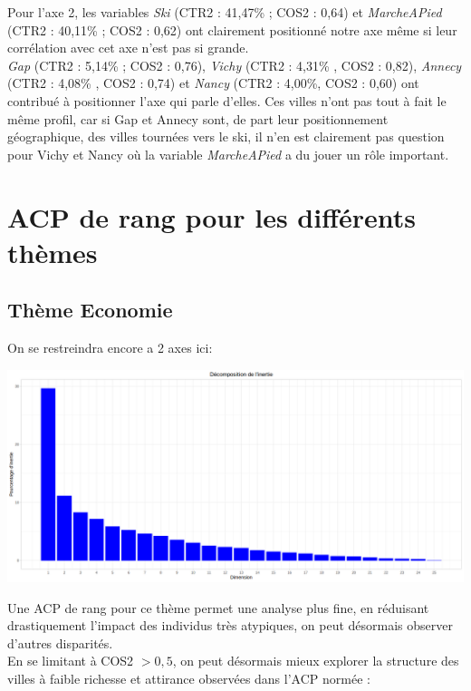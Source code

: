 \documentclass{article}
\begin{document}
Pour l'axe 2, les variables \emph{Ski} (CTR2 : 41,47\% ; COS2 : 0,64) et \emph{MarcheAPied} (CTR2 : 40,11\% ; COS2 : 0,62) ont clairement positionné notre axe même si leur corrélation avec cet axe n'est pas si grande. \\

\emph{Gap} (CTR2 : 5,14\% ; COS2 : 0,76), \emph{Vichy} (CTR2 : 4,31\% , COS2 : 0,82), \emph{Annecy} (CTR2 : 4,08\% , COS2 : 0,74) et \emph{Nancy} (CTR2 : 4,00\%, COS2 : 0,60) ont contribué à positionner l'axe qui parle d'elles. Ces villes n'ont pas tout à fait le même profil, car si Gap et Annecy sont, de part leur positionnement géographique, des villes tournées vers le ski, il n'en est clairement pas question pour Vichy et Nancy où la variable \emph{MarcheAPied} a du jouer un rôle important.

\section{ACP de rang pour les différents thèmes}

\subsection{Thème Economie}

On se restreindra encore a 2 axes ici:

\centerline{\includegraphics[width=0.8\linewidth]{images/VP2}}

Une ACP de rang pour ce thème permet une analyse plus fine, en réduisant drastiquement l'impact des individus très atypiques, on peut désormais observer d'autres disparités.\\
En se limitant à COS2 $>0,5$, on peut désormais mieux explorer la structure des villes à faible richesse et attirance observées dans l'ACP normée :
\end{document}
